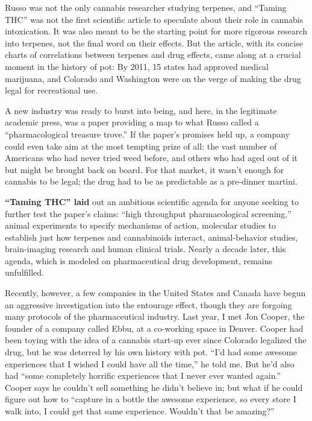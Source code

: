 Russo was not the only cannabis researcher studying terpenes, and
``Taming THC'' was not the first scientific article to speculate about
their role in cannabis intoxication. It was also meant to be the
starting point for more rigorous research into terpenes, not the final
word on their effects. But the article, with its concise charts of
correlations between terpenes and drug effects, came along at a crucial
moment in the history of pot: By 2011, 15 states had approved medical
marijuana, and Colorado and Washington were on the verge of making the
drug legal for recreational use.

A new industry was ready to burst into being, and here, in the
legitimate academic press, was a paper providing a map to what Russo
called a ``pharmacological treasure trove.'' If the paper's promises
held up, a company could even take aim at the most tempting prize of
all: the vast number of Americans who had never tried weed before, and
others who had aged out of it but might be brought back on board. For
that market, it wasn't enough for cannabis to be legal; the drug had to
be as predictable as a pre-dinner martini.

\textbf{``Taming THC'' laid} out an ambitious scientific agenda for
anyone seeking to further test the paper's claims: ``high throughput
pharmacological screening,'' animal experiments to specify mechanisms of
action, molecular studies to establish just how terpenes and
cannabinoids interact, animal-behavior studies, brain-imaging research
and human clinical trials. Nearly a decade later, this agenda, which is
modeled on pharmaceutical drug development, remains unfulfilled.

Recently, however, a few companies in the United States and Canada have
begun an aggressive investigation into the entourage effect, though they
are forgoing many protocols of the pharmaceutical industry. Last year, I
met Jon Cooper, the founder of a company called Ebbu, at a co-working
space in Denver. Cooper had been toying with the idea of a cannabis
start-up ever since Colorado legalized the drug, but he was deterred by
his own history with pot. ``I'd had some awesome experiences that I
wished I could have all the time,'' he told me. But he'd also had ``some
completely horrific experiences that I never ever wanted again.'' Cooper
says he couldn't sell something he didn't believe in; but what if he
could figure out how to ``capture in a bottle the awesome experience, so
every store I walk into, I could get that same experience. Wouldn't that
be amazing?''

